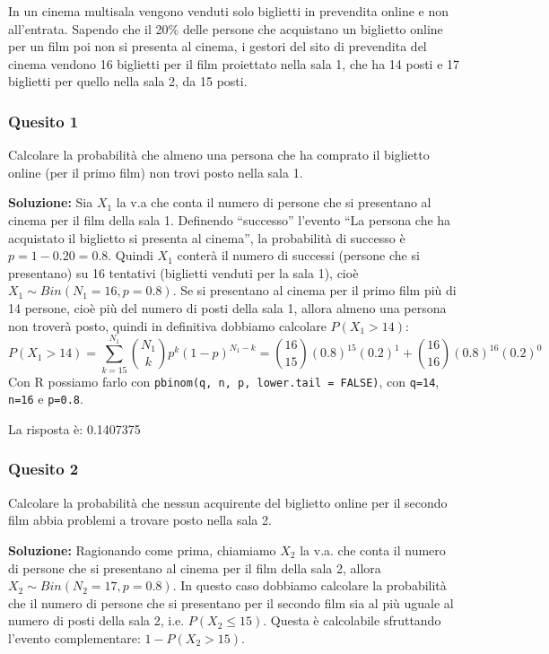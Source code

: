 \documentclass[12pt, a4paper]{article}
\begin{document}
\vspace{0.5cm}
\begin{tcolorbox}[colback=lightergray!10, colframe=tocsec, title=\textbf{Esercizio 8}]
In un cinema multisala vengono venduti solo biglietti in prevendita online e non all’entrata. Sapendo che il 20\% delle persone che acquistano un biglietto online per un film poi non si presenta al cinema, i gestori del sito di prevendita del cinema vendono 16 biglietti per il film proiettato nella sala 1, che ha 14 posti e 17 biglietti per quello nella sala 2, da 15 posti.
\end{tcolorbox}

\subsubsection*{Quesito 1}
Calcolare la probabilità che almeno una persona che ha comprato il biglietto online (per il primo film) non trovi posto nella sala 1.

\textbf{Soluzione:}
Sia $X_1$ la v.a che conta il numero di persone che si presentano al cinema per il film della sala 1.
Definendo “successo” l’evento “La persona che ha acquistato il biglietto si presenta al cinema”, la probabilità di successo è $p=1 - 0.20 = 0.8$. Quindi $X_1$ conterà il numero di successi (persone che si presentano) su 16 tentativi (biglietti venduti per la sala 1), cioè $X_1 \sim Bin(N_1=16, p=0.8)$.
Se si presentano al cinema per il primo film più di 14 persone, cioè più del numero di posti della sala 1, allora almeno una persona non troverà posto, quindi in definitiva dobbiamo calcolare $P(X_1 > 14)$:
$$ P(X_1 > 14) = \sum_{k=15}^{N_1} \binom{N_1}{k} p^k (1-p)^{N_1-k} = \binom{16}{15}(0.8)^{15}(0.2)^1 + \binom{16}{16}(0.8)^{16}(0.2)^0 $$
Con R possiamo farlo con \texttt{pbinom(q, n, p, lower.tail = FALSE)}, con \texttt{q=14}, \texttt{n=16} e \texttt{p=0.8}.

La risposta è: 0.1407375

\subsubsection*{Quesito 2}
Calcolare la probabilità che nessun acquirente del biglietto online per il secondo film abbia problemi a trovare posto nella sala 2.

\textbf{Soluzione:}
Ragionando come prima, chiamiamo $X_2$ la v.a. che conta il numero di persone che si presentano al cinema per il film della sala 2, allora $X_2 \sim Bin(N_2=17, p=0.8)$.
In questo caso dobbiamo calcolare la probabilità che il numero di persone che si presentano per il secondo film sia al più uguale al numero di posti della sala 2, i.e. $P(X_2 \leq 15)$.
Questa è calcolabile sfruttando l'evento complementare: $1 - P(X_2 > 15)$.
\end{document}
